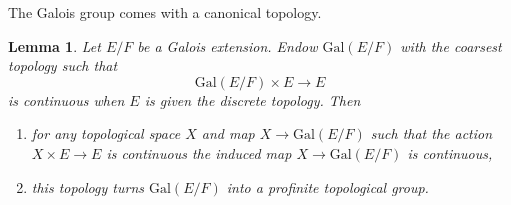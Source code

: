 \documentclass{stacks-project}
\theoremstyle{plain}
\newtheorem{lemma}[subsection]{Lemma}
\theoremstyle{definition}
\theoremstyle{remark}
\numberwithin{equation}{subsection}
\begin{document}
\noindent
The Galois group comes with a canonical topology.

\begin{lemma}
\label{lemma-galois-profinite}
Let $E/F$ be a Galois extension. Endow $\text{Gal}(E/F)$ with the coarsest
topology such that
$$
\text{Gal}(E/F) \times E \longrightarrow E
$$
is continuous when $E$ is given the discrete topology. Then
\begin{enumerate}
\item for any topological space $X$ and map $X \to \text{Gal}(E/F)$
such that the action $X \times E \to E$ is continuous the induced map
$X \to \text{Gal}(E/F)$ is continuous,
\item this topology turns $\text{Gal}(E/F)$ into
a profinite topological group.
\end{enumerate}
\end{lemma}
\end{document}
